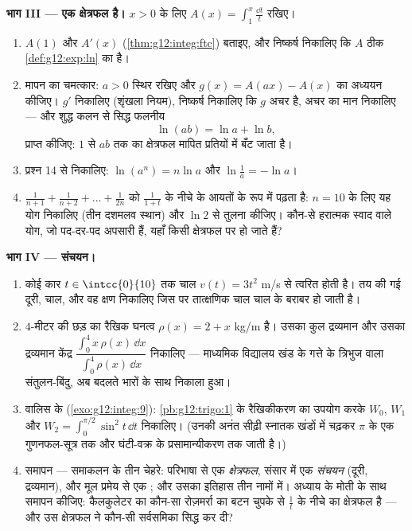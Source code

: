 \begin{problem}
\medskip
\noindent\textbf{भाग III ---  एक क्षेत्रफल है।}
$x > 0$ के लिए $A(x) = \displaystyle\int_1^x \frac{\dd t}{t}$ रखिए।
\begin{enumerate}[resume]
  \item $A(1)$ और $A'(x)$ (\cref{thm:g12:integ:ftc}) बताइए, और निष्कर्ष निकालिए कि $A$ ठीक \cref{def:g12:exp:ln}
        का  है।
  \item मापन का चमत्कार: $a > 0$ स्थिर रखिए और $g(x) = A(ax) - A(x)$ का अध्ययन कीजिए। $g'$
        निकालिए (शृंखला नियम), निष्कर्ष निकालिए कि $g$ अचर है, अचर का मान
        निकालिए --- और शुद्ध कलन से सिद्ध फलनीय 
        \[
        \ln(ab) = \ln a + \ln b ,
        \]
        प्राप्त कीजिए: $1$ से $ab$ तक का क्षेत्रफल मापित प्रतियों में
        बँट जाता है।
  \item प्रश्न 14 से निकालिए: $\ln(a^n) = n\ln a$ और $\ln\frac1a = -\ln a$।
  \item {} $\frac{1}{n+1} + \frac{1}{n+2} + \dots + \frac{1}{2n}$ को $\frac{1}{1 + t}$ के नीचे के आयतों के रूप में पढ़ता है: $n = 10$ के
        लिए यह योग निकालिए (तीन दशमलव स्थान) और $\ln 2$ से तुलना कीजिए।
        कौन-से हरात्मक स्वाद वाले योग, जो पद-दर-पद अपसारी हैं, यहाँ किसी
        क्षेत्रफल पर  हो जाते हैं?
\end{enumerate}

\medskip
\noindent\textbf{भाग IV --- संचयन।}
\begin{enumerate}[resume]
  \item कोई कार $t \in \intcc{0}{10}$ तक चाल $v(t) = 3t^2$ m/s से त्वरित होती है। तय की गई दूरी,
         चाल, और वह क्षण निकालिए जिस पर तात्क्षणिक चाल  चाल के
        बराबर हो जाती है।
  \item $4$-मीटर की छड़ का रैखिक घनत्व $\rho(x) = 2 + x$ kg/m है। उसका कुल द्रव्यमान
        और उसका द्रव्यमान केंद्र $\dfrac{\int_0^4 x\,\rho(x)\,\dd x}{\int_0^4
        \rho(x)\,\dd x}$ निकालिए --- माध्यमिक विद्यालय खंड
        के गत्ते के त्रिभुज वाला संतुलन-बिंदु, अब बदलते भारों के साथ
        निकाला हुआ।
  \item वालिस के  (\cref{exo:g12:integ:9}): \cref{pb:g12:trigo:1} के रैखिकीकरण का उपयोग करके $W_0$,
        $W_1$ और $W_2 = \int_0^{\pi/2} \sin^2 t\,\dd t$ निकालिए। (उनकी अनंत सीढ़ी स्नातक खंडों में चढ़कर
        $\pi$ के एक गुणनफल-सूत्र तक और घंटी-वक्र के प्रसामान्यीकरण तक जाती
        है।)
  \item समापन --- समाकलन के तीन चेहरे: परिभाषा से एक \emph{क्षेत्रफल},
        संसार में एक \emph{संचयन} (दूरी, द्रव्यमान), और मूल प्रमेय से एक
        \emph{}; और उसका इतिहास तीन नामों में। अध्याय के मोती के
        साथ समापन कीजिए: कैलकुलेटर का कौन-सा रोज़मर्रा का बटन चुपके से $\frac1t$
        के नीचे का क्षेत्रफल है --- और उस क्षेत्रफल ने कौन-सी सर्वसमिका
        सिद्ध कर दी?
\end{enumerate}
\end{problem}
